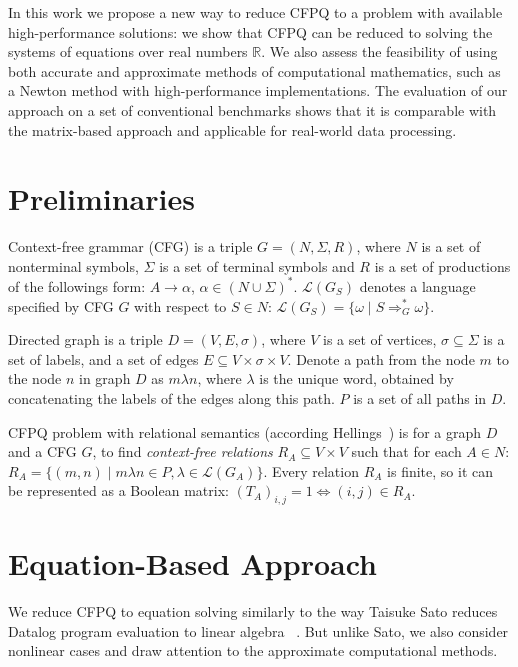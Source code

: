 \documentclass[sigconf]{acmart}
\begin{document}
In this work we propose a new way to reduce CFPQ to a problem with available high-performance solutions: we show that CFPQ can be reduced to solving the systems of equations over real numbers $\mathbb{R}$.
We also assess the feasibility of using both accurate and approximate methods of computational mathematics, such as a Newton method with high-performance implementations.
The evaluation of our approach on a set of conventional benchmarks shows that it is comparable with the matrix-based approach and applicable for real-world data processing.

\section{Preliminaries}

Context-free grammar (CFG) is a triple $G=(N, \Sigma, R)$, where $N$ is a set of nonterminal symbols, $\Sigma$ is a set of terminal symbols and $R$ is a set of productions of the followings form: $A \to \alpha$, $\alpha \in (N \cup \Sigma)^*$.
$\mathcal{L}(G_S)$ denotes a language specified by CFG $G$ with respect to $S \in N$: $\mathcal{L}(G_S) = \{\omega \mid S \Rightarrow_{G}^{*} \omega\}$.

Directed graph is a triple $D = (V,E,\sigma)$, where $V$ is a set of vertices, $\sigma \subseteq \Sigma$ is a set of labels, and a set of edges $E\subseteq V\times \sigma \times V$.
Denote a path from the node $m$ to the node $n$ in graph $D$ as $m\lambda n$, where
$\lambda$ is the unique word, obtained by concatenating the labels of the edges along this path.
$P$ is a set of all paths in $D$.

CFPQ problem with relational semantics (according Hellings~\cite{hellings2014conjunctive}) is for a graph $D$ and a CFG $G$, to find \emph{context-free relations} $R_A \subseteq V \times V$ such that for each $A \in N$: $R_A = \{(m, n) \mid m\lambda n \in P, \lambda \in \mathcal{L}(G_A)\}.$
Every relation $R_A$ is finite, so it can be represented as a Boolean matrix: $(T_A)_{i,j} = 1 \iff (i,j) \in R_A$.

\section{Equation-Based Approach}

We reduce CFPQ to equation solving similarly to the way Taisuke Sato reduces Datalog program evaluation to linear algebra ~\cite{sato2017linear}.
But unlike Sato, we also consider nonlinear cases and draw attention to the approximate computational methods.
\end{document}
